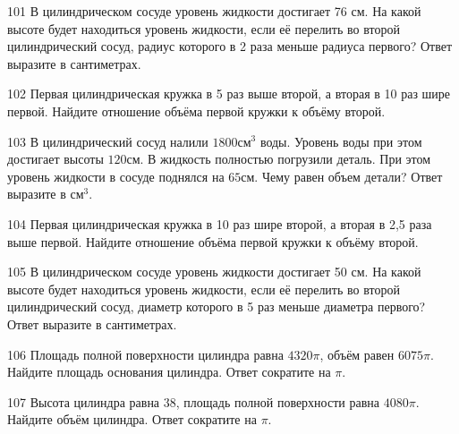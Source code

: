 \documentclass[4apaper]{article}
\begin{document}
\begin{taskBN}{101}
В цилиндрическом сосуде уровень жидкости достигает 76 см. На какой высоте будет находиться уровень жидкости, если её перелить во второй цилиндрический сосуд, радиус которого в 2 раза меньше радиуса первого? Ответ выразите в сантиметрах.
\end{taskBN}

\begin{taskBN}{102}
 Первая цилиндрическая кружка в 5 раз выше второй, а вторая в 10 раз шире первой. Найдите отношение объёма первой кружки к объёму второй.
\end{taskBN}

\begin{taskBN}{103}
В цилиндрический сосуд налили $1800\mbox{см}^3$ воды. Уровень воды при этом достигает высоты $120$см. В жидкость полностью погрузили деталь. При этом уровень жидкости в сосуде поднялся на $65$см. Чему равен объем детали? Ответ выразите в $\mbox{см}^3$.
\end{taskBN}

\begin{taskBN}{104}
 Первая цилиндрическая кружка в 10 раз шире второй, а вторая в 2,5 раза выше первой. Найдите отношение объёма первой кружки к объёму второй.
\end{taskBN}

\begin{taskBN}{105}
В цилиндрическом сосуде уровень жидкости достигает 50 см. На какой высоте будет находиться уровень жидкости, если её перелить во второй цилиндрический сосуд, диаметр которого в 5 раз меньше диаметра первого? Ответ выразите в сантиметрах.
\end{taskBN}

\begin{taskBN}{106}
Площадь полной поверхности цилиндра равна $4320\pi$, объём равен $6075\pi$. Найдите площадь основания цилиндра. Ответ сократите на $\pi$.
\end{taskBN}

\begin{taskBN}{107}
Высота цилиндра равна $38$, площадь полной поверхности равна $4080\pi$. Найдите объём цилиндра. Ответ сократите на $\pi$.
\end{taskBN}
\end{document}

